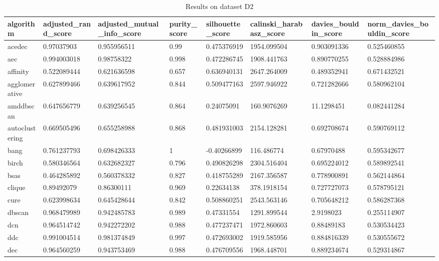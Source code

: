 \begin{table}[H]
\centering
\caption{Results on dataset D2}
\label{S55_Table}
\begin{tabular}{|l|l|l|l|l|l|l|l|}
\hline
algorithm & adjusted\_rand\_score & adjusted\_mutual\_info\_score & purity\_score & silhouette\_score & calinski\_harabasz\_score & davies\_bouldin\_score & norm\_davies\_bouldin\_score \\
\hline
acedec & 0.97037903 & 0.955956511 & 0.99 & 0.475376919 & 1954.099504 & 0.903091336 & 0.525460855 \\
\hline
aec & 0.994003018 & 0.98758322 & 0.998 & 0.472286745 & 1908.441763 & 0.890770255 & 0.528884986 \\
\hline
affinity & 0.522089444 & 0.621636598 & 0.657 & 0.636940131 & 2647.264009 & 0.489352941 & 0.671432521 \\
\hline
agglomerative & 0.627899466 & 0.639617952 & 0.844 & 0.509477163 & 2597.946922 & 0.721282666 & 0.580962104 \\
\hline
amddbscan & 0.647656779 & 0.639256545 & 0.864 & 0.24075091 & 160.9076269 & 11.1298451 & 0.082441284 \\
\hline
autoclustering & 0.669505496 & 0.655258988 & 0.868 & 0.481931003 & 2154.128281 & 0.692708674 & 0.590769112 \\
\hline
bang & 0.761237793 & 0.698426333 & 1 & -0.40266899 & 116.486774 & 0.67970488 & 0.595342677 \\
\hline
birch & 0.580346564 & 0.632682327 & 0.796 & 0.490826298 & 2304.516404 & 0.695224012 & 0.589892541 \\
\hline
bsas & 0.464285892 & 0.560378332 & 0.827 & 0.418755289 & 2167.356587 & 0.778900891 & 0.562144864 \\
\hline
clique & 0.89492079 & 0.86300111 & 0.969 & 0.22634138 & 378.1918154 & 0.727727073 & 0.578795121 \\
\hline
cure & 0.623998634 & 0.645428644 & 0.842 & 0.508860251 & 2543.563146 & 0.705648212 & 0.586287368 \\
\hline
dbscan & 0.968479989 & 0.942485783 & 0.989 & 0.47331554 & 1291.899544 & 2.9198023 & 0.255114907 \\
\hline
dcn & 0.964514742 & 0.942272202 & 0.988 & 0.477237471 & 1972.860603 & 0.88489183 & 0.530534423 \\
\hline
ddc & 0.991004514 & 0.981374849 & 0.997 & 0.472693002 & 1919.585956 & 0.884816339 & 0.530555672 \\
\hline
dec & 0.964560259 & 0.943753469 & 0.988 & 0.476709556 & 1968.448701 & 0.889234674 & 0.529314867 \\

\end{tabular}
\end{table}
